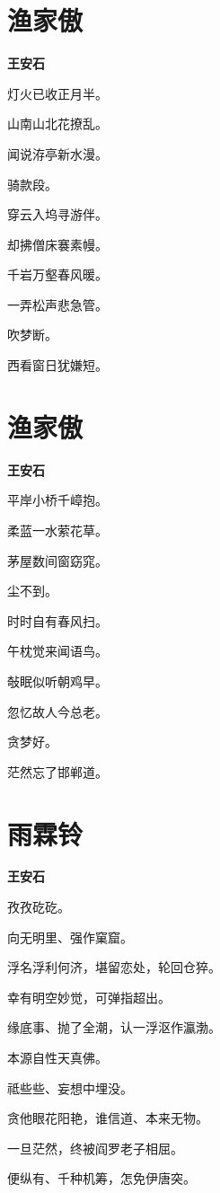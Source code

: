 \documentclass[12pt,a4paper]{ctexbook}
\begin{document}
\section{渔家傲}
\textbf{王安石}\par\vspace{0.5em}
灯火已收正月半。\par
山南山北花撩乱。\par
闻说洊亭新水漫。\par
骑款段。\par
穿云入坞寻游伴。\par
却拂僧床褰素幔。\par
千岩万壑春风暖。\par
一弄松声悲急管。\par
吹梦断。\par
西看窗日犹嫌短。\par

\section{渔家傲}
\textbf{王安石}\par\vspace{0.5em}
平岸小桥千嶂抱。\par
柔蓝一水萦花草。\par
茅屋数间窗窈窕。\par
尘不到。\par
时时自有春风扫。\par
午枕觉来闻语鸟。\par
敧眠似听朝鸡早。\par
忽忆故人今总老。\par
贪梦好。\par
茫然忘了邯郸道。\par

\section{雨霖铃}
\textbf{王安石}\par\vspace{0.5em}
孜孜矻矻。\par
向无明里、强作窠窟。\par
浮名浮利何济，堪留恋处，轮回仓猝。\par
幸有明空妙觉，可弹指超出。\par
缘底事、抛了全潮，认一浮沤作瀛渤。\par
本源自性天真佛。\par
祗些些、妄想中埋没。\par
贪他眼花阳艳，谁信道、本来无物。\par
一旦茫然，终被阎罗老子相屈。\par
便纵有、千种机筹，怎免伊唐突。\par
\end{document}
